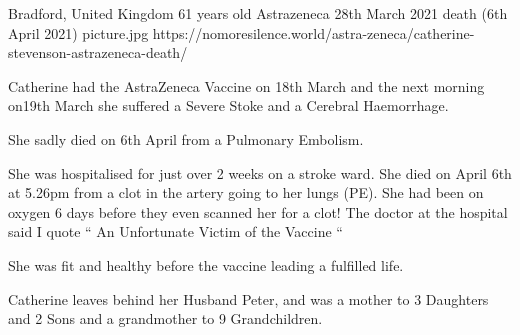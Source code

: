           {Bradford, United Kingdom}
          {61 years old}
          {Astrazeneca}
          {28th March 2021}
          {death (6th April 2021)}
          {picture.jpg}
          {https://nomoresilence.world/astra-zeneca/catherine-stevenson-astrazeneca-death/}
          {
            
Catherine had the AstraZeneca Vaccine on 18th March and the next morning on19th
March she suffered a Severe Stoke and a Cerebral Haemorrhage.

She sadly died on 6th April from a Pulmonary Embolism.

She was hospitalised for just over 2 weeks on a stroke ward. She died on April
6th at 5.26pm from a clot in the artery going to her lungs (PE). She had been on
oxygen 6 days before they even scanned her for a clot! The doctor at the
hospital said I quote “ An Unfortunate Victim of the Vaccine “

She was fit and healthy before the vaccine leading a fulfilled life.

Catherine leaves behind her Husband Peter, and was a mother to 3 Daughters and 2
Sons and a grandmother to 9 Grandchildren.

}

